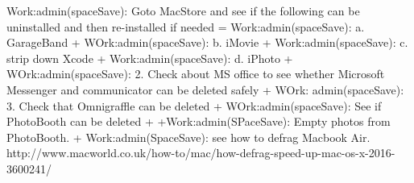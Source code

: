 {\item \tiny Work:admin(spaceSave): Goto MacStore and see if the following can be uninstalled and then
  re-installed if needed = Work:admin(spaceSave):
  a. GarageBand  + WOrk:admin(spaceSave):  b. iMovie +
  Work:admin(spaceSave): c. strip down Xcode +
  Work:admin(spaceSave): d. iPhoto 
  + WOrk:admin(spaceSave): 2. Check about MS office to see whether Microsoft Messenger and
  communicator can be deleted safely 
  + WOrk: admin(spaceSave): 3. Check that Omnigraffle can be
  deleted + WOrk:admin(spaceSave): See if PhotoBooth can be deleted +
  +Work:admin(SPaceSave): Empty photos from PhotoBooth. 
  + Work:admin(SpaceSave): see how to defrag Macbook Air.
  http://www.macworld.co.uk/how-to/mac/how-defrag-speed-up-mac-os-x-2016-3600241/


}

